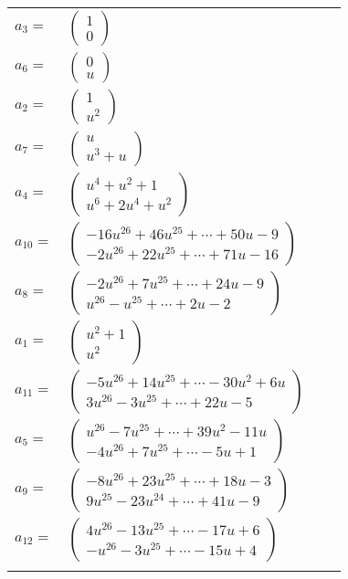 \documentclass[1p]{elsarticle_modified}
\theoremstyle{definition}
\begin{document}
\begin{tabular}{m{7pt} m{180pt} m{7pt} m{180pt} }
\flushright $a_{3}=$&$\begin{pmatrix}1\\0\end{pmatrix}$ \\
\flushright $a_{6}=$&$\begin{pmatrix}0\\u\end{pmatrix}$ \\
\flushright $a_{2}=$&$\begin{pmatrix}1\\u^2\end{pmatrix}$ \\
\flushright $a_{7}=$&$\begin{pmatrix}u\\u^3+u\end{pmatrix}$ \\
\flushright $a_{4}=$&$\begin{pmatrix}u^4+u^2+1\\u^6+2 u^4+u^2\end{pmatrix}$ \\
\flushright $a_{10}=$&$\begin{pmatrix}-16 u^{26}+46 u^{25}+\cdots+50 u-9\\-2 u^{26}+22 u^{25}+\cdots+71 u-16\end{pmatrix}$ \\
\flushright $a_{8}=$&$\begin{pmatrix}-2 u^{26}+7 u^{25}+\cdots+24 u-9\\u^{26}- u^{25}+\cdots+2 u-2\end{pmatrix}$ \\
\flushright $a_{1}=$&$\begin{pmatrix}u^2+1\\u^2\end{pmatrix}$ \\
\flushright $a_{11}=$&$\begin{pmatrix}-5 u^{26}+14 u^{25}+\cdots-30 u^2+6 u\\3 u^{26}-3 u^{25}+\cdots+22 u-5\end{pmatrix}$ \\
\flushright $a_{5}=$&$\begin{pmatrix}u^{26}-7 u^{25}+\cdots+39 u^2-11 u\\-4 u^{26}+7 u^{25}+\cdots-5 u+1\end{pmatrix}$ \\
\flushright $a_{9}=$&$\begin{pmatrix}-8 u^{26}+23 u^{25}+\cdots+18 u-3\\9 u^{25}-23 u^{24}+\cdots+41 u-9\end{pmatrix}$ \\
\flushright $a_{12}=$&$\begin{pmatrix}4 u^{26}-13 u^{25}+\cdots-17 u+6\\- u^{26}-3 u^{25}+\cdots-15 u+4\end{pmatrix}$\\&\end{tabular}
\end{document}
